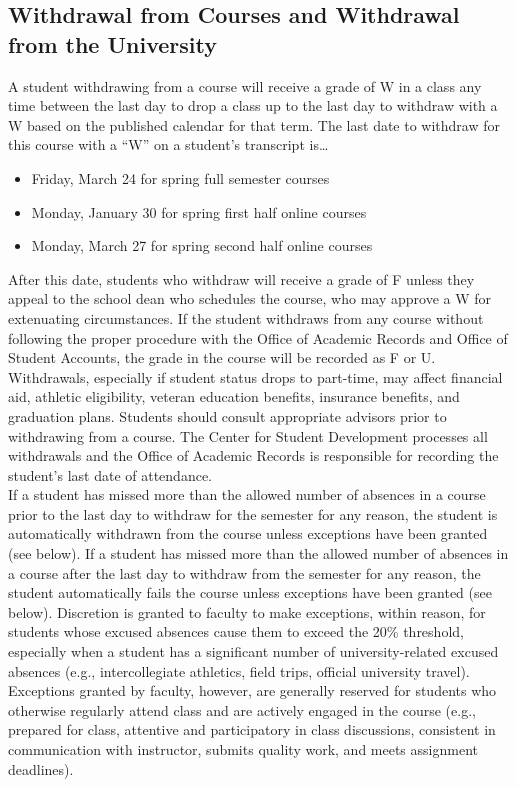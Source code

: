 \documentclass[11pt]{article}
\begin{document}
\subsection*{Withdrawal from Courses and Withdrawal from the University}
A student withdrawing from a course will receive a grade of W in a class any time between the last day to drop a class up to the last day to withdraw with a W based on the published calendar for that term. The last date to withdraw for this course with a “W” on a student’s transcript is…
\begin{itemize}
	\item Friday, March 24 for spring full semester courses
	\item Monday, January 30 for spring first half online courses
	\item Monday, March 27 for spring second half online courses
\end{itemize}
After this date, students who withdraw will receive a grade of F unless they appeal to the school dean who schedules the course, who may approve a W for extenuating circumstances. If the student withdraws from any course without following the proper procedure with the Office of Academic Records and Office of Student Accounts, the grade in the course will be recorded as F or U.\\

Withdrawals, especially if student status drops to part-time, may affect financial aid, athletic eligibility, veteran education benefits, insurance benefits, and graduation plans. Students should consult appropriate advisors prior to withdrawing from a course. The Center for Student Development processes all withdrawals and the Office of Academic Records is responsible for recording the student’s last date of attendance.\\

If a student has missed more than the allowed number of absences in a course prior to the last day to withdraw for the semester for any reason, the student is automatically withdrawn from the course unless exceptions have been granted (see below). If a student has missed more than the allowed number of absences in a course after the last day to withdraw from the semester for any reason, the student automatically fails the course unless exceptions have been granted (see below). Discretion is granted to faculty to make exceptions, within reason, for students whose excused absences cause them to exceed the 20\% threshold, especially when a student has a significant number of university-related excused absences (e.g., intercollegiate athletics, field trips, official university travel). Exceptions granted by faculty, however, are generally reserved for students who otherwise regularly attend class and are actively engaged in the course (e.g., prepared for class, attentive and participatory in class discussions, consistent in communication with instructor, submits quality work, and meets assignment deadlines).\\
\end{document}
